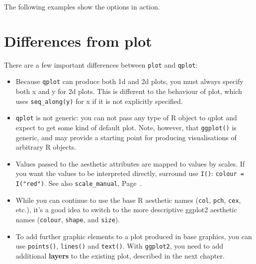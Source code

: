 The following examples show the options in action.

% 


\section{Differences from plot}
\label{sec:plot_diffs}

There are a few important differences between {\tt plot} and {\tt qplot}:

\begin{itemize}
  \item Because {\tt qplot} can produce both 1d and 2d plots, you must always specify both x and y for 2d plots.  This is different to the behaviour of plot, which uses {\tt seq\_along(y)} for x if it is not explicitly specified.
  
  \item {\tt qplot} is not generic: you can not pass any type of R object to qplot and expect to get some kind of default plot.  Note, however, that {\tt ggplot()} is generic, and may provide a starting point for producing visualisations of arbitrary R objects.
  
  \item Values passed to the aesthetic attributes are mapped to values by scales.  If you want the values to be interpreted directly, surround use {\tt I()}: {\tt colour = I("red")}.  See also {\tt scale\_manual}, Page~\pageref{sec:scale_special}.        %
  
  \item While you can continue to use the base R aesthetic names ({\tt col},  {\tt pch}, {\tt cex}, etc.), it's a good idea to switch to the more descriptive ggplot2 aesthetic names ({\tt colour}, {\tt shape}, and {\tt size}).


  \item To add further graphic elements to a plot produced in base graphics, you can use {\tt points()}, {\tt lines()} and {\tt text()}.  With {\tt ggplot2}, you need to add additional {\bf layers} to the existing plot, described in the next chapter.
  
\end{itemize}


